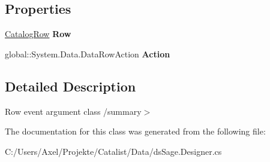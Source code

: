 \subsection*{Properties}
\begin{DoxyCompactItemize}
\item 
\hyperlink{class_products_1_1_data_1_1ds_sage_1_1_catalog_row}{Catalog\+Row} {\bfseries Row}\hypertarget{class_products_1_1_data_1_1ds_sage_1_1_catalog_row_change_event_abf80e2e71c791c10b49054f08021aebb}{}\label{class_products_1_1_data_1_1ds_sage_1_1_catalog_row_change_event_abf80e2e71c791c10b49054f08021aebb}

\item 
global\+::\+System.\+Data.\+Data\+Row\+Action {\bfseries Action}\hypertarget{class_products_1_1_data_1_1ds_sage_1_1_catalog_row_change_event_a112bb28e3151fbab33e9ec5fef3529b4}{}\label{class_products_1_1_data_1_1ds_sage_1_1_catalog_row_change_event_a112bb28e3151fbab33e9ec5fef3529b4}

\end{DoxyCompactItemize}


\subsection{Detailed Description}
Row event argument class /summary$>$ 

The documentation for this class was generated from the following file\+:\begin{DoxyCompactItemize}
\item 
C\+:/\+Users/\+Axel/\+Projekte/\+Catalist/\+Data/ds\+Sage.\+Designer.\+cs\end{DoxyCompactItemize}
